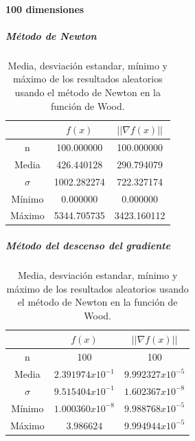 \paragraph{100 dimensiones}

\subparagraph{Método de Newton}


\begin{table}[H]
    \centering
    \begin{tabular}{ccc} \hline
                 & $f(x)$      & $||\nabla f(x)||$ \\ \hline
        n        & 100.000000  & 100.000000        \\
        Media    & 426.440128  & 290.794079        \\
        $\sigma$ & 1002.282274 & 722.327174        \\
        Mínimo   & 0.000000    & 0.000000          \\
        Máximo   & 5344.705735 & 3423.160112       \\ \hline
    \end{tabular}
    \caption{Media, desviación estandar, mínimo y máximo de los resultados aleatorios usando el método de Newton en la función de Wood.}
    \label{table:rosembrock_100_random_newton}
\end{table}

\subparagraph{Método del descenso del gradiente}

\begin{table}[H]
    \centering
    \begin{tabular}{ccc} \hline
                 & $f(x)$             & $||\nabla f(x)||$  \\ \hline
        n        & 100                & 100                \\
        Media    & $2.391974x10^{-1}$ & $9.992327x10^{-5}$ \\
        $\sigma$ & $9.515404x10^{-1}$ & $1.602367x10^{-8}$ \\
        Mínimo   & $1.000360x10^{-8}$ & $9.988768x10^{-5}$ \\
        Máximo   & $3.986624$         & $9.994944x10^{-5}$ \\ \hline
    \end{tabular}
    \caption{Media, desviación estandar, mínimo y máximo de los resultados aleatorios usando el método de Newton en la función de Wood.}
    \label{table:rosembrock_100_random_gradient}
\end{table}